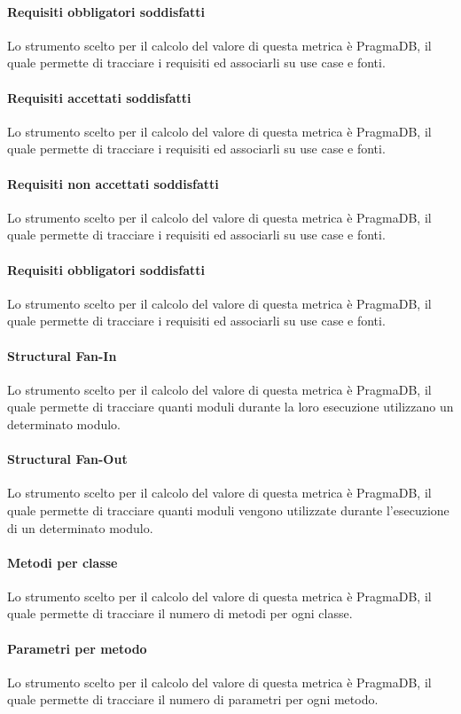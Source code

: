 \paragraph{Requisiti obbligatori soddisfatti}
Lo strumento scelto per il calcolo del valore di questa metrica è PragmaDB, il quale permette di tracciare i requisiti ed associarli su use case e fonti.
\paragraph{Requisiti accettati soddisfatti}
Lo strumento scelto per il calcolo del valore di questa metrica è PragmaDB, il quale permette di tracciare i requisiti ed associarli su use case e fonti.
\paragraph{Requisiti non accettati soddisfatti}
Lo strumento scelto per il calcolo del valore di questa metrica è PragmaDB, il quale permette di tracciare i requisiti ed associarli su use case e fonti.
\paragraph{Requisiti obbligatori soddisfatti}
Lo strumento scelto per il calcolo del valore di questa metrica è PragmaDB, il quale permette di tracciare i requisiti ed associarli su use case e fonti.
\paragraph{Structural Fan-In}
Lo strumento scelto per il calcolo del valore di questa metrica è PragmaDB, il quale permette di tracciare quanti moduli durante la loro esecuzione utilizzano un determinato modulo.
\paragraph{Structural Fan-Out}
Lo strumento scelto per il calcolo del valore di questa metrica è PragmaDB, il quale permette di tracciare quanti moduli vengono utilizzate durante l'esecuzione di un determinato modulo.
\paragraph{Metodi per classe}
Lo strumento scelto per il calcolo del valore di questa metrica è PragmaDB, il quale permette di tracciare il numero di metodi per ogni classe.
\paragraph{Parametri per metodo}
Lo strumento scelto per il calcolo del valore di questa metrica è PragmaDB, il quale permette di tracciare il numero di parametri per ogni metodo.
